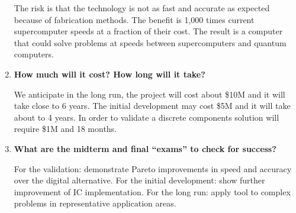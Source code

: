 \documentclass[12pt]{article}
\begin{document}
\begin{enumerate}
            The risk is that the technology is not as fast and accurate as
            expected because of fabrication methods. 
            The benefit is 1,000 times current supercomputer speeds 
            at a fraction of their cost.
            The result is a computer that could solve problems at speeds between 
            supercomputers and quantum computers.
             \par
        \item[\SSeis]    
            \textbf{How much will it cost? How long will it take?} \par
            We anticipate in the long run, the project will cost about \$10M
            and it will take close to 6 years.
            The initial development may cost \$5M and it will take about to 4 
            years.
            In order to validate a discrete components solution will require 
            \$1M and 18 months.
            \par
        \item[\SSiete]   
            \textbf{What are the midterm and final ``exams'' to 
            check for success?}\par
            
            For the validation: demonstrate Pareto improvements in speed and accuracy   
            over the digital alternative.
            For the initial development: show further improvement of IC implementation.
            For the long run: apply tool to complex problems in representative 
            application areas.
    \end{enumerate}
\end{document}
